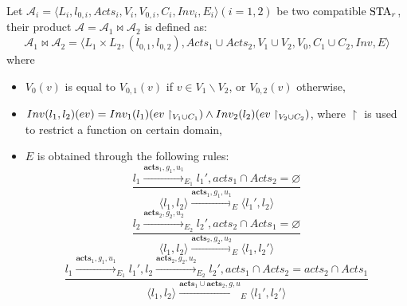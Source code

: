 \begin{definition}[Product]
Let $\mathscr{A}_{i}=\langle L_{i}, l_{0,i}, Acts_{i}, V_{i}, V_{0,i}, C_{i}, Inv_{i}, E_{i} \rangle(i=1,2)$ be two compatible $\mbox{STA}_r$, their product $\mathscr{A}=\mathscr{A}_{1}\bowtie \mathscr{A}_{2}$ is defined as:
\[
    \mathscr{A}_{1}\bowtie \mathscr{A}_{2}=\langle L_1\times L_2, (l_{0,1}, l_{0,2}), Acts_1\cup Acts_2, V_{1}\cup V_{2}, V_0, C_{1}\cup C_{2}, Inv, E\rangle
\]
where
\begin{itemize}
    \item $V_0(v)$ is equal to $V_{0,1}(v)$ if $v\in V_1\backslash V_2$, or $V_{0,2}(v)$ otherwise,
    \item $Inv(l_1,l_2)(ev)=Inv_1(l_1)(ev\restriction_{V_1\cup C_1})\land Inv_2(l_2)(ev\restriction_{V_2\cup C_2})$, where $\restriction$ is used to restrict a function on certain domain,
    \item $E$ is obtained through the following rules:
        \begin{equation}
            \frac{l_{1}\xrightarrow{\textbf{acts}_{1},g_{1},u_{1}}_{E_1} l_{1}', acts_{1}\cap Acts_{2}=\varnothing}{\langle l_{1},l_{2}\rangle\xrightarrow{\textbf{acts}_{1},g_{1},u_{1}}_E\langle l_{1}',l_{2}\rangle}
        \end{equation}
        \begin{equation}
            \frac{l_{2}\xrightarrow{\textbf{acts}_{2},g_{2},u_{2}}_{E_2} l_{2}', acts_{2}\cap Acts_{1}=\varnothing}{\langle l_{1},l_{2}\rangle\xrightarrow{\textbf{acts}_{2},g_{2},u_{2}}_E\langle l_{1},l_{2}'\rangle}
        \end{equation}
        \begin{equation}
            \label{equ:product}
            \frac{l_{1}\xrightarrow{\textbf{acts}_{1},g_{1},u_{1}}_{E_1} l_{1}', l_{2}\xrightarrow{\textbf{acts}_{2},g_{2},u_{2}}_{E_2} l_{2}',acts_{1}\cap Acts_{2}=acts_{2}\cap Acts_{1}}
        {\langle l_{1},l_{2}\rangle\xrightarrow{\textbf{acts}_{1}\cup \textbf{acts}_{2},g, u}_E\langle l_{1}',l_{2}'\rangle}
        \end{equation}
\end{itemize}
\end{definition}

